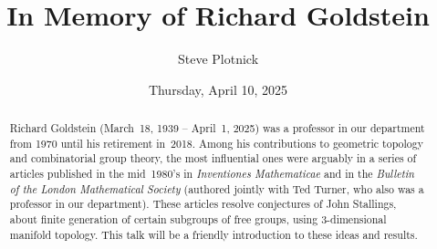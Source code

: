 \documentclass{UAmathtalk}
\author{Steve Plotnick}
\title{In Memory of Richard Goldstein}
\date{Thursday, April 10, 2025}
\begin{document}
\maketitle

\begin{abstract}
Richard Goldstein (March~18, 1939 -- April~1, 2025) was a professor in our department from 1970 until his retirement in~2018.
Among his contributions to geometric topology and combinatorial group theory, the most influential ones were arguably in a series of articles published in the mid~1980’s in \emph{Inventiones Mathematicae} and in the \emph{Bulletin of the London Mathematical Society} (authored jointly with Ted Turner, who also was a professor in our department).
These articles resolve conjectures of John Stallings, about finite generation of certain subgroups of free groups, using 3-dimensional manifold topology.
This talk will be a friendly introduction to these ideas and results.
\end{abstract}
\end{document}
